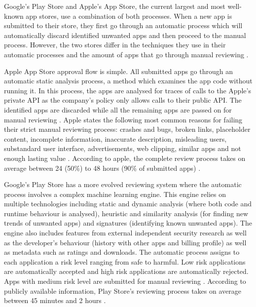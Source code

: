 Google's Play Store and Apple's App Store, the current largest and most well-known app stores, use a combination of both processes. When a new app is submitted to their store, they first go through an automatic process which will automatically discard identified unwanted apps and then proceed to the manual process. However, the two stores differ in the techniques they use in their automatic processes and the amount of apps that go through manual reviewing \cite{AppleInsiderWebsite, AndroidWhitePaper}.

Apple App Store approval flow is simple. All submitted apps go through an automatic static analysis process, a method which examines the app code without running it. In this process, the apps are analysed for traces of calls to the Apple's private API as the company's policy only allows calls to their public API. The identified apps are discarded while all the remaining apps are passed on for manual reviewing \cite{AppleInsiderWebsite, AppleApprovalFortune}. Apple states the following most common reasons for failing their strict manual reviewing process: crashes and bugs, broken links, placeholder content, incomplete information, inaccurate description, misleading users, substandard user interface, advertisements, web clipping, similar apps and not enough lasting value \cite{AppleReviewRejections}. According to apple, the complete review process takes on average between 24 (50\%) to 48 hours (90\% of submitted apps) \cite{AppleReviewTime}. 

Google's Play Store has a more evolved reviewing system where the automatic process involves a complex machine learning engine. This engine relies on multiple technologies including static and dynamic analysis (where both code and runtime behaviour is analysed), heuristic and similarity analysis (for finding new trends of unwanted apps) and signatures (identifying known unwanted apps). The engine also includes features from external independent security research as well as the developer's behaviour (history with other apps and billing profile) as well as metadata such as ratings and downloads. The automatic process assigns to each application a risk level ranging from safe to harmful. Low risk applications are automatically accepted and high risk applications are automatically rejected. Apps with medium risk level are submitted for manual reviewing \cite{AndroidWhitePaper}. According to publicly available information, Play Store's reviewing process takes on average between 45 minutes and 2 hours \cite{AndroidReviewTime}.

